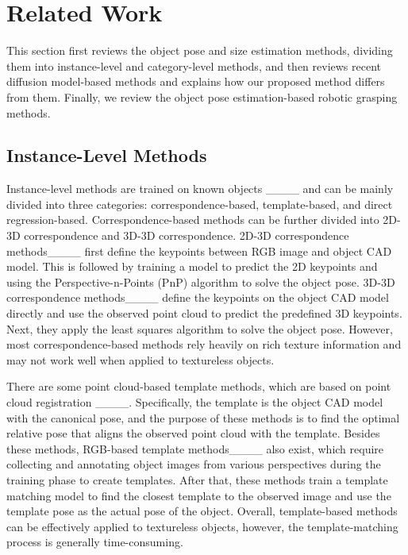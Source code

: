 \section{Related Work}
\label{Related Work}
This section first reviews the object pose and size estimation methods, dividing them into instance-level and category-level methods, and then reviews recent diffusion model-based methods and explains how our proposed method differs from them. Finally, we review the object pose estimation-based robotic grasping methods.

\vspace{-1.25em}
\subsection{Instance-Level Methods}
Instance-level methods are trained on known objects ____ and can be mainly divided into three categories: correspondence-based, template-based, and direct regression-based. Correspondence-based methods can be further divided into 2D-3D correspondence and 3D-3D correspondence. 2D-3D correspondence methods____ first define the keypoints between RGB image and object CAD model. This is followed by training a model to predict the 2D keypoints and using the Perspective-n-Points (PnP) algorithm to solve the object pose. 3D-3D correspondence methods____ define the keypoints on the object CAD model directly and use the observed point cloud to predict the predefined 3D keypoints. Next, they apply the least squares algorithm to solve the object pose. However, most correspondence-based methods rely heavily on rich texture information and may not work well when applied to textureless objects.

\par There are some point cloud-based template methods, which are based on point cloud registration ____. Specifically, the template is the object CAD model with the canonical pose, and the purpose of these methods is to find the optimal relative pose that aligns the observed point cloud with the template. Besides these methods, RGB-based template methods____ also exist, which require collecting and annotating object images from various perspectives during the training phase to create templates. After that, these methods train a template matching model to find the closest template to the observed image and use the template pose as the actual pose of the object. Overall, template-based methods can be effectively applied to textureless objects, however, the template-matching process is generally time-consuming.

